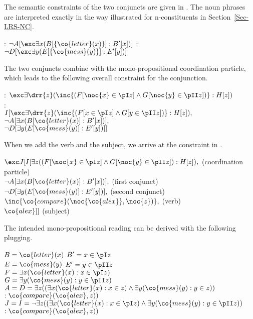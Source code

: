 \documentclass[output=paper]{langsci/langscibook}
\begin{document}
The semantic constraints of the two conjuncts are given in . 
The noun phrases are interpreted exactly in the way illustrated for n-constituents in Section~\ref{Sec-LRS-NC}.

\ea \label{ex-brief-mail-conj}
\begin{xlist}
\ex
{}: $\lnot A[\exc\exists x (B[\{\co{letter}(x)\}]: B'[x])]$
\ex
{}: $\lnot D[\exc\exists y (E[\{\co{mess}(y)\}]: E'[y])]$
\end{xlist}
\z 

The two conjuncts combine with the mono-propositional coordination particle, which leads to the following overall constraint for the conjunction.

\ea \label{ex-brief-mail-coord}
\begin{xlist}
\ex
{}: $\exc \exists \drr{z} (\inc{(F[\noc{x} \in \pI z] \land G[\noc{y} \in \pII z])} : H[z])$\\
\ex {}:\\
\qquad $I[
\exc \exists \drr{z} (\inc{(F[x \in \pI z] \land G[y \in \pII z])} : H[z]),$\\
\qquad $\lnot A[\exists x (B[\co{letter}(x)]: B'[x])],$\\
\qquad $\lnot D[\exists y (E[\co{mess}(y)]: E'[y])]
]$
\end{xlist}
\z 

When we add the verb and the subject, we arrive at the  constraint in .

\ea \label{ex-brief-mail-lf}
$\exc J[I[
\exists z ((F[\noc{x} \in \pI z] \land G[\noc{y} \in \pII z]) : H[z]),$
\hfill (coordination particle)\\
$\lnot A[\exists x (B[\co{letter}(x)]: B'[x])],$
\hfill (first conjunct)\\
$\lnot D[\exists y (E[\co{mess}(y)]: E'[y])],$
\hfill (second conjunct)\\
$\inc{\co{compare}(\noc{\co{alex}},\noc{z})},$ \hfill (verb)\\
$\co{alex} 
]]$ \hfill (subject)
\z 

The intended mono-propositional reading can be derived with the following plugging.

\ea \label{ex-brief-mail-plug}
$B = \co{letter}(x)$ \qquad$B' = x \in \pI z$\\
$E = \co{mess}(y)$ \qquad $E' = y \in \pII z$\\
$F = \exists x (\co{letter}(x):x \in \pI z)$\\
$G = \exists y (\co{mess}(y) : y \in \pII z)$\\
$A = D = \exists z ((\exists x (\co{letter}(x):x \in z) \land 
\exists y (\co{mess}(y) : y \in z))$\\
\hspace*{\fill}$: \co{compare}(\co{alex},z))$\\
$J = I = \lnot \exists z ((\exists x (\co{letter}(x):x \in \pI z) \land 
\exists y (\co{mess}(y) : y \in \pII z))$\\
\hspace*{\fill}$ : \co{compare}(\co{alex},z))$
\z 
\end{document}
